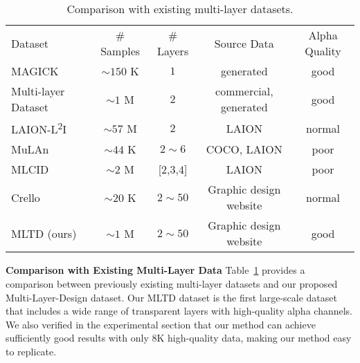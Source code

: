 \begin{table}[!t]
\begin{minipage}[t]{1\linewidth}
\centering
{}
\resizebox{1.0\linewidth}{!}
{
\begin{tabular}{l|c|c|c|c}
\multirow{1}{*}{Dataset} & \multirow{1}{*}{\# Samples} & \multirow{1}{*}{\# Layers} & \multirow{1}{*}{Source Data} & \multirow{1}{*}{Alpha Quality} \\
\shline
MAGICK~\cite{burgert2024magick} & $\sim150$ K & $1$ & generated & good \\
Multi-layer Dataset~\cite{zhang2024transparent} & $\sim1$ M & $2$ & commercial, generated & good  \\
LAION-L\textsuperscript{2}I~\cite{zhang2023text2layer} & $\sim57$ M & $2$ & LAION & normal \\
MuLAn~\cite{tudosiu2024mulan} & $\sim44$ K & $2\sim 6$ & COCO, LAION & poor  \\
MLCID~\cite{huang2024layerdiff} & $\sim2$ M & [$2$,$3$,$4$] & LAION & poor  \\
Crello~\cite{yamaguchi2021canvasvae} & $\sim20$ K & $2\sim50$ & Graphic design website & normal  \\ \hline
MLTD (ours) & $\sim1$ M & $2\sim50$ & Graphic design website & good  \\
\end{tabular}
}
\vspace{-3mm}
\caption{
\small{Comparison with existing multi-layer datasets.}}
\label{tab:dataset_compare}
\end{minipage}
\vspace{-5mm}
\end{table}

\vspace{1mm}
\noindent\textbf{Comparison with Existing Multi-Layer Data}
Table~\ref{tab:dataset_compare} provides a comparison between previously existing multi-layer datasets and our proposed Multi-Layer-Design dataset. Our MLTD dataset is the first large-scale dataset that includes a wide range of transparent layers with high-quality alpha channels. We also verified in the experimental section that our method can achieve sufficiently good results with only $8$K high-quality data, making our method easy to replicate.